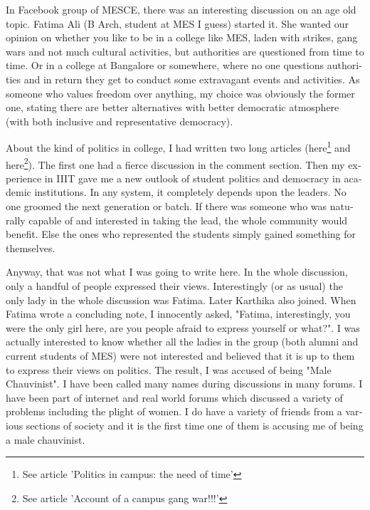 \vskip 2pt
\begin{english}
In Facebook group of MESCE, there was an interesting discussion on an age old topic. 
Fatima Ali (B Arch, student at MES I guess) started it. She wanted our opinion on whether 
you like to be in a college like MES, laden with strikes, gang wars and not much cultural 
activities, but authorities are questioned from time to time. Or in a college at Bangalore 
or somewhere, where no one questions authorities and in return they get to conduct some 
extravagant events and activities. As someone who values freedom over anything, my 
choice was obviously the former one, stating there are better alternatives with better 
democratic atmosphere (with both inclusive and representative democracy).

About the kind of politics in college, I had written two long articles (here\footnote{See article 'Politics in campus: the need of time'} 
and here\footnote{See article 'Account of a campus gang war!!!'}). The first one had a fierce discussion in the comment section. 
Then my experience in IIIT gave me a new outlook of student politics and democracy in academic institutions. 
In any system, it completely depends upon the leaders. No one groomed the next generation or batch. If there 
was someone who was naturally capable of and interested in taking the lead, the whole community would 
benefit. Else the ones who represented the students simply gained something for themselves.

Anyway, that was not what I was going to write here. In the whole discussion, only a handful of people 
expressed their views. Interestingly (or as usual) the only lady in the whole discussion was Fatima. Later 
Karthika also joined. When Fatima wrote a concluding note, I innocently asked, "Fatima, interestingly, you 
were the only girl here, are you people afraid to express yourself or what?". I was actually interested to 
know whether all the ladies in the group (both alumni and current students of MES) were not interested 
and believed that it is up to them to express their views on politics. The result, I was accused of being 
"Male Chauvinist". I have been called many names during discussions in many forums. I have been 
part of internet and real world forums which discussed a variety of problems including the plight of 
women. I do have a variety of friends from a various sections of society and it is the first time one of 
them is accusing me of being a male chauvinist.


\end{english}
